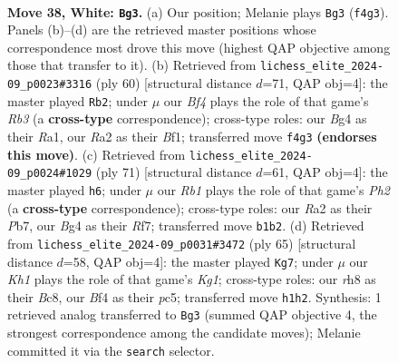\documentclass[11pt]{article}
\begin{document}
\clearpage

\begin{figure}[p]\centering
\begin{subfigure}{0.46\textwidth}\centering
\resizebox{\linewidth}{!}{%
\newchessgame
\chessboard[
  setfen={r5nr/p6p/1b3k2/8/5BB1/PPp4P/R1P3P1/1R5K w - - 0 38},
  showmover=false,
  pgfstyle=straightmove, color=movearrow, markmove={f4-g3}
]}
\caption{}
\end{subfigure}\hfill
\begin{subfigure}{0.46\textwidth}\centering
\resizebox{\linewidth}{!}{%
\newchessgame
\chessboard[
  setfen={k2r4/p6p/2p5/4rb2/8/1R3PP1/P4K1P/R4B2 w - - 0 31},
  showmover=false,
  pgfstyle=straightmove, color=movearrow, markmove={b3-b2}
]}
\caption{}
\end{subfigure}
\\[4pt]
\begin{subfigure}{0.46\textwidth}\centering
\resizebox{\linewidth}{!}{%
\newchessgame
\chessboard[
  setfen={2k5/1pp2rpp/1b6/pP2R1B1/2P5/6P1/7P/4K3 b - - 0 36},
  showmover=false,
  pgfstyle=straightmove, color=movearrow, markmove={h7-h6}
]}
\caption{}
\end{subfigure}\hfill
\begin{subfigure}{0.46\textwidth}\centering
\resizebox{\linewidth}{!}{%
\newchessgame
\chessboard[
  setfen={2b1r1k1/5p2/p1p3p1/2Pp4/3Pp2B/8/4N3/3K3R b - - 1 33},
  showmover=false,
  pgfstyle=straightmove, color=movearrow, markmove={g8-g7}
]}
\caption{}
\end{subfigure}
\caption{\textbf{Move 38, White: \texttt{Bg3}.} (a) Our position; Melanie plays \texttt{Bg3} (\texttt{f4g3}). Panels (b)--(d) are the retrieved master positions whose correspondence most drove this move (highest QAP objective among those that transfer to it). (b) Retrieved from \texttt{lichess\_elite\_2024-09\_p0023\#3316} (ply 60) [structural distance $d$=71, QAP obj=4]: the master played \texttt{Rb2}; under $\mu$ our \emph{Bf4} plays the role of that game's \emph{Rb3} (a \textbf{cross-type} correspondence); cross-type roles: our \emph{B}g4 as their \emph{R}a1, our \emph{R}a2 as their \emph{B}f1; transferred move \texttt{f4g3} \textbf{(endorses this move)}. (c) Retrieved from \texttt{lichess\_elite\_2024-09\_p0024\#1029} (ply 71) [structural distance $d$=61, QAP obj=4]: the master played \texttt{h6}; under $\mu$ our \emph{Rb1} plays the role of that game's \emph{Ph2} (a \textbf{cross-type} correspondence); cross-type roles: our \emph{R}a2 as their \emph{P}b7, our \emph{B}g4 as their \emph{R}f7; transferred move \texttt{b1b2}. (d) Retrieved from \texttt{lichess\_elite\_2024-09\_p0031\#3472} (ply 65) [structural distance $d$=58, QAP obj=4]: the master played \texttt{Kg7}; under $\mu$ our \emph{Kh1} plays the role of that game's \emph{Kg1}; cross-type roles: our \emph{r}h8 as their \emph{B}c8, our \emph{B}f4 as their \emph{p}c5; transferred move \texttt{h1h2}. Synthesis: 1 retrieved analog transferred to \texttt{Bg3} (summed QAP objective 4, the strongest correspondence among the candidate moves); Melanie committed it via the \texttt{search} selector.}
\label{fig:thought-m74}
\end{figure}
\end{document}
